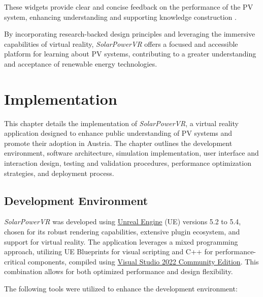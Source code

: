 \documentclass[draft, final]{vutinfth} %
\begin{document}
These widgets provide clear and concise feedback on the performance of the PV system, enhancing understanding and supporting knowledge construction \cite{Merchant2014VrEffectiveness, Mikropoulos2011VrEducational, Sung2015Effects}.

By incorporating research-backed design principles and leveraging the immersive capabilities of virtual reality, \textit{SolarPowerVR} offers a focused and accessible platform for learning about PV systems, contributing to a greater understanding and acceptance of renewable energy technologies.

\chapter{Implementation}

This chapter details the implementation of \textit{SolarPowerVR}, a virtual reality application designed to enhance public understanding of PV systems and promote their adoption in Austria. The chapter outlines the development environment, software architecture, simulation implementation, user interface and interaction design, testing and validation procedures, performance optimization strategies, and deployment process.

\section{Development Environment}

\textit{SolarPowerVR} was developed using \href{https://www.unrealengine.com/de}{Unreal Engine} (UE) versions 5.2 to 5.4, chosen for its robust rendering capabilities, extensive plugin ecosystem, and support for virtual reality. The application leverages a mixed programming approach, utilizing UE Blueprints for visual scripting and C++ for performance-critical components, compiled using \href{https://visualstudio.microsoft.com/de/vs/community/}{Visual Studio 2022 Community Edition}. This combination allows for both optimized performance and design flexibility. 

The following tools were utilized to enhance the development environment:
\end{document}
